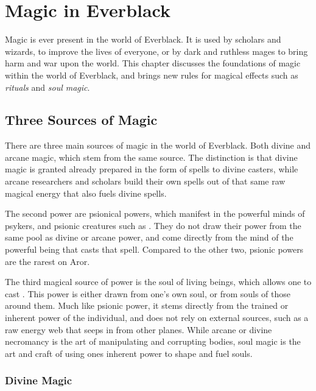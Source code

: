 \chapter{Magic in Everblack}
\label{sec:Magic}

Magic is ever present in the world of Everblack. It is used by scholars and
wizards, to improve the lives of everyone, or by dark and ruthless mages to
bring harm and war upon the world. This chapter discusses the foundations of
magic within the world of Everblack, and brings new rules for magical effects
such as \emph{rituals} and \emph{soul magic}.

\section{Three Sources of Magic}

There are three main sources of magic in the world of Everblack. Both divine
and arcane magic, which stem from the same source. The distinction is that
divine magic is granted already prepared in the form of spells to divine
casters, while arcane researchers and scholars build their own spells out of
that same raw magical energy that also fuels divine spells.

The second power are psionical powers, which manifest in the powerful minds of
psykers, and psionic creatures such as . They do not draw
their power from the same pool as divine or arcane power, and come directly
from the mind of the powerful being that casts that spell. Compared to the
other two, psionic powers are the rarest on Aror.

The third magical source of power is the soul of living beings, which allows
one to cast . This power is either drawn from one's
own soul, or from souls of those around them. Much like psionic power, it
stems directly from the trained or inherent power of the individual, and does
not rely on external sources, such as a raw energy web that seeps in from
other planes. While arcane or divine necromancy is the art of manipulating
and corrupting bodies, soul magic is the art and craft of using ones inherent
power to shape and fuel souls.

\subsection{Divine Magic}
\label{sec:Divine Magic}


